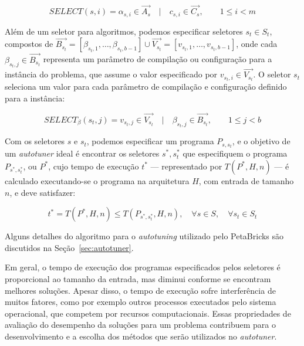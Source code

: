 \documentclass[a4paper, 11pt]{article}
\begin{document}
\begin{equation*}
    SELECT(s, i) = \alpha_{s,i} \in \overrightarrow{A_{s}} \quad | \quad c_{s,i} \in \overrightarrow{C_{s}},
    \quad\quad 1 \leq i < m
\end{equation*}

Além de um seletor para algoritmos, podemos especificar seletores $s_t \in S_t$,
compostos de $\overrightarrow{B_{s_t}} = [\beta_{s_t,1},\dots,\beta_{s_t,b-1}] 
\cup \overrightarrow{V_{s_t}} = [v_{s_t,1},\dots,v_{s_t,b-1}]$,
onde cada $\beta_{s_t,j} \in \overrightarrow{B_{s_t}}$ representa um parâmetro
de compilação ou configuração para a instância do problema, que assume o valor
especificado por $v_{s_t,i} \in \overrightarrow{V_{s_t}}$.
O seletor $s_t$ seleciona um valor para cada parâmetro de compilação e 
configuração definido para a instância:

\begin{equation*}
    SELECT_{\beta}(s_t, j) = v_{s_t,j} \in \overrightarrow{V_{s_t}} \quad | \quad \beta_{s_t,j} \in \overrightarrow{B_{s_t}},
    \quad\quad 1 \leq j < b
\end{equation*}

Com os seletores $s$ e $s_t$, podemos especificar um programa
$P_{s,s_t}$, e o objetivo de um \emph{autotuner} ideal é encontrar
os seletores $s^*,s_{t}^{*}$ que especifiquem o programa $P_{s^*,s_{t}^{*}}$, 
ou $P^*$, cujo tempo de execução $t^*$ --- representado por $T(P^*,H,n)$ --- 
é calculado executando-se o programa na arquitetura $H$, com entrada de tamanho
$n$, e deve satisfazer:

\begin{equation*}
    t^* = T(P^*,H,n) \leq T(P_{s^*,s_{t}^{*}},H,n), \quad \forall s \in S, \quad \forall s_t \in S_t
\end{equation*}

Alguns detalhes do algoritmo para o \emph{autotuning} utilizado pelo PetaBricks
são discutidos na Seção~\ref{sec:autotuner}.

Em geral, o tempo de execução dos programas especificados pelos seletores
é proporcional ao tamanho da entrada, mas diminui conforme
se encontram melhores soluções. Apesar disso, o tempo de execução sofre
interferência de muitos fatores, como por exemplo outros processos executados
pelo sistema operacional, que competem por recursos computacionais.
Essas propriedades de avaliação do desempenho da soluções para um problema 
contribuem para o desenvolvimento e a escolha dos métodos
que serão utilizados no \emph{autotuner}.
\end{document}
